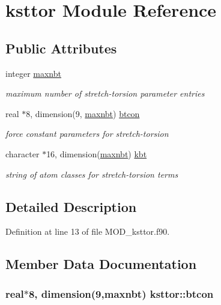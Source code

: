 \hypertarget{classksttor}{\section{ksttor Module Reference}
\label{classksttor}
}
\subsection*{Public Attributes}
\begin{DoxyCompactItemize}
\item 
integer \hyperlink{classksttor_a14b6f7b59817819c6f1ab879e8aa4f53}{maxnbt}
\begin{DoxyCompactList}\small\item\em maximum number of stretch-\/torsion parameter entries \end{DoxyCompactList}\item 
real $\ast$8, dimension(9, \hyperlink{classksttor_a14b6f7b59817819c6f1ab879e8aa4f53}{maxnbt}) \hyperlink{classksttor_a4db9fd83f8a9e39f5226220b97376648}{btcon}
\begin{DoxyCompactList}\small\item\em force constant parameters for stretch-\/torsion \end{DoxyCompactList}\item 
character $\ast$16, dimension(\hyperlink{classksttor_a14b6f7b59817819c6f1ab879e8aa4f53}{maxnbt}) \hyperlink{classksttor_a6efaad79cd35a8c6c8acce14669b81b1}{kbt}
\begin{DoxyCompactList}\small\item\em string of atom classes for stretch-\/torsion terms \end{DoxyCompactList}\end{DoxyCompactItemize}


\subsection{Detailed Description}


Definition at line 13 of file M\-O\-D\-\_\-ksttor.\-f90.



\subsection{Member Data Documentation}
\hypertarget{classksttor_a4db9fd83f8a9e39f5226220b97376648}{
\subsubsection[{btcon}]{\setlength{\rightskip}{0pt plus 5cm}real$\ast$8, dimension(9,{\bf maxnbt}) ksttor\-::btcon}}\label{classksttor_a4db9fd83f8a9e39f5226220b97376648}


